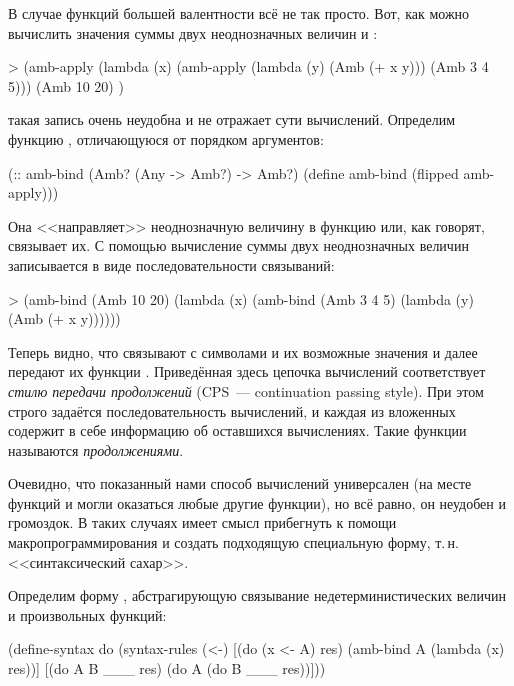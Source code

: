 В случае функций большей валентности всё не так просто. Вот, как можно вычислить значения суммы двух неоднозначных величин  и :
\begin{SchemeCode}[emph={x,y}]
   > (amb-apply 
      (lambda (x) 
        (amb-apply 
         (lambda (y) 
           (Amb (+ x y))) 
         (Amb 3 4 5)))
      (Amb 10 20) )
\end{SchemeCode}\vspace{-\medskipamount}
 такая запись очень неудобна и не отражает сути вычислений. Определим функцию , отличающуюся от  порядком аргументов:
\newpage
\begin{Definition}
(:: amb-bind (Amb? (Any -> Amb?) -> Amb?)
  (define amb-bind (flipped amb-apply)))
\end{Definition}
Она <<направляет>> неоднозначную величину в функцию или, как говорят, связывает их. С помощью  вычисление суммы двух неоднозначных величин записывается в виде последовательности связываний:
\begin{SchemeCode}[emph={x,y}]
  > (amb-bind 
     (Amb 10 20) (lambda (x) 
                   (amb-bind 
                     (Amb 3 4 5) (lambda (y) 
                                   (Amb (+ x y))))))
\end{SchemeCode}\vspace{-\medskipamount}
Теперь видно, что  связывают с символами  и  их возможные значения и далее передают их функции \s{+}. Приведённая здесь цепочка вычислений соответствует \emph{стилю передачи продолжений} (CPS~--- continuation passing style). При этом строго задаётся последовательность вычислений, и каждая из вложенных  содержит в себе информацию об оставшихся вычислениях. Такие функции называются \emph{продолжениями}.

Очевидно, что показанный нами способ вычислений универсален (на месте функций   и \s{+} могли оказаться любые другие функции), но всё равно, он неудобен и громоздок. В таких случаях имеет смысл прибегнуть к помощи макропрограммирования и создать подходящую специальную форму, т.\,н. <<синтаксический сахар>>.

Определим форму , абстрагирующую связывание недетерминистических величин и произвольных функций:

\begin{Definition}[emph={x,A,res,B}]
(define-syntax do
  (syntax-rules (<-) 
    [(do (x <- A) res) (amb-bind A (lambda (x) res))]
    [(do A B ___ res)  (do A (do B ___ res))]))
\end{Definition}

